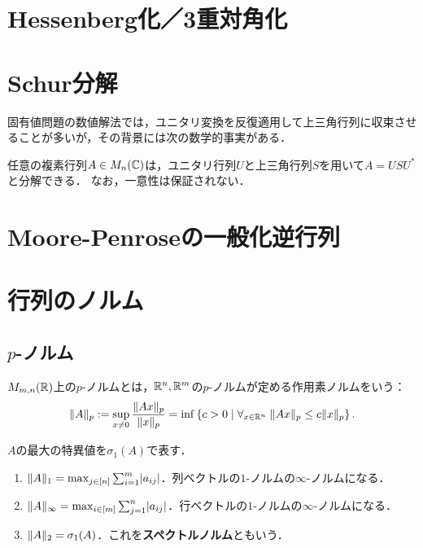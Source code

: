 \documentclass[uplatex, dvipdfmx]{jsreport}
\begin{document}
\section{Hessenberg化／3重対角化}

\section{Schur分解}

\begin{tcolorbox}[colframe=ForestGreen, colback=ForestGreen!10!white,breakable,colbacktitle=ForestGreen!40!white,coltitle=black,fonttitle=\bfseries\sffamily,
title=]
    固有値問題の数値解法では，ユニタリ変換を反復適用して上三角行列に収束させることが多いが，その背景には次の数学的事実がある．
\end{tcolorbox}

\begin{theorem}
    任意の複素行列$A\in M_n(\mathbb{C})$は，ユニタリ行列$U$と上三角行列$S$を用いて$A=USU^*$と分解できる．
    なお，一意性は保証されない．
\end{theorem}

\section{Moore-Penroseの一般化逆行列}

\section{行列のノルム}

\subsection{$p$-ノルム}

\begin{definition}[$p$-norm]
    $M_{m,n}(\mathbb{R})$上の$p$-ノルムとは，$\mathbb{R}^n,\mathbb{R}^m$の$p$-ノルムが定める作用素ノルムをいう：
    \[\|A\|_p:=\sup_{x\ne 0}\frac{\|Ax\|_p}{\|x\|_p}=\inf\left\{c>0\mid\forall_{x\in\mathbb{R}^n}\;\|Ax\|_p\le c\|x\|_p\right\}.\]
\end{definition}

\begin{lemma}
    $A$の最大の特異値を$\sigma_1(A)$で表す．
    \begin{enumerate}
        \item $\|A\|_1=\max_{j\in[n]}\sum_{i=1}^m\lvert a_{ij}\rvert$．列ベクトルの$1$-ノルムの$\infty$-ノルムになる．
        \item $\|A\|_\infty=\max_{i\in[m]}\sum^n_{j=1}\lvert a_{ij}\rvert$．行ベクトルの$1$-ノルムの$\infty$-ノルムになる．
        \item $\|A\|_2=\sigma_1(A)$．これを\textbf{スペクトルノルム}ともいう．
    \end{enumerate}
\end{lemma}
\end{document}

